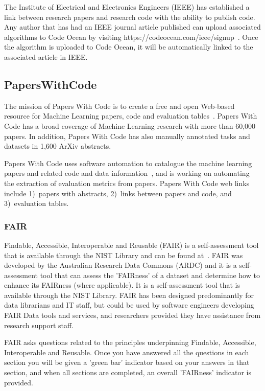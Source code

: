 The Institute of Electrical and Electronics Engineers (IEEE) has established a link between research papers and research code with the ability to publish code. Any author that has had an IEEE journal article published  can upload associated algorithms to Code Ocean by visiting https://codeocean.com/ieee/signup~\cite{IEEE7920486}. Once the algorithm is uploaded to Code Ocean, it will be automatically linked to the associated article in IEEE.
\subsection{PapersWithCode}
The mission of Papers With Code is to create a free and open Web-based resource for Machine Learning papers, code and evaluation tables~\cite{paperswithcode}.  Papers With Code has a broad coverage of Machine Learning research with more than 60,000 papers. In addition, Papers With Code has also manually annotated tasks and datasets in 1,600 ArXiv abstracts.

Papers With Code uses software automation to catalogue the machine learning papers and related code and data  information~\cite{paperswithcodegit}, and is working on automating the extraction of evaluation metrics from papers. Papers With Code web links include 1)~papers with abstracts, 2)~links between papers and code, and 3)~evaluation tables.

 
 \subsubsection{FAIR}
Findable, Accessible, Interoperable and Reusable (FAIR)  is a self-assessment tool that is available through the NIST Library and can be found at~\cite{FAIR}. FAIR was developed by the Australian Research Data Commons (ARDC)  and it is a self-assessment tool that can assess the 'FAIRness' of a dataset and determine how to enhance its FAIRness (where applicable). It is a self-assessment tool that is available through the NIST Library. FAIR has been designed predominantly for data librarians and IT staff, but could be used by software engineers developing FAIR Data tools and services, and researchers provided they have assistance from research support staff.

FAIR asks questions related to the principles underpinning Findable, Accessible, Interoperable and Reusable. Once you have answered all the questions in each section you will be given a 'green bar' indicator based on your answers in that section, and when all sections are completed, an overall 'FAIRness' indicator is provided.

